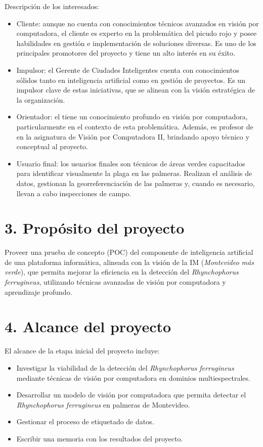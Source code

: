 \documentclass[
11pt, %
]{charter}
\begin{document}
Descripción de los interesados:
\begin{itemize}
  \item Cliente: aunque no cuenta con conocimientos técnicos avanzados en visión por computadora, el cliente es experto en la problemática del picudo rojo y posee habilidades en gestión e implementación de soluciones diversas. Es uno de los principales promotores del proyecto y tiene un alto interés en su éxito.

  \item Impulsor: el Gerente de Ciudades Inteligentes cuenta con conocimientos sólidos tanto en inteligencia artificial como en gestión de proyectos. Es un impulsor clave de estas iniciativas, que se alinean con la visión estratégica de la organización.

  \item Orientador: el \supname tiene un conocimiento profundo en visión por computadora, particularmente en el contexto de esta problemática. Además, es profesor de \pertesupname en la asignatura de Visión por Computadora II, brindando apoyo técnico y conceptual al proyecto.

  \item Usuario final: los usuarios finales son técnicos de áreas verdes capacitados para identificar visualmente la plaga en las palmeras. Realizan el análisis de datos, gestionan la georreferenciación de las palmeras y, cuando es necesario, llevan a cabo inspecciones de campo.
\end{itemize}

\section{3. Propósito del proyecto}
\label{sec:proposito}

Proveer una prueba de concepto (POC) del componente de inteligencia artificial de una plataforma informática, alineada con la visión de la IM (\textit{Montevideo más verde}), que permita mejorar la eficiencia en la detección del \textit{Rhynchophorus ferrugineus}, utilizando técnicas avanzadas de visión por computadora y aprendizaje profundo.

\section{4. Alcance del proyecto}
\label{sec:alcance}

El alcance de la etapa inicial del proyecto incluye:
\begin{itemize}
  \item Investigar la viabilidad de la detección del \textit{Rhynchophorus ferrugineus} mediante técnicas de visión por computadora en dominios multiespectrales.
  \item Desarrollar un modelo de visión por computadora que permita detectar el \textit{Rhynchophorus ferrugineus} en palmeras de Montevideo.
  \item Gestionar el proceso de etiquetado de datos.
  \item Escribir una memoria con los resultados del proyecto.
\end{itemize}
\end{document}
